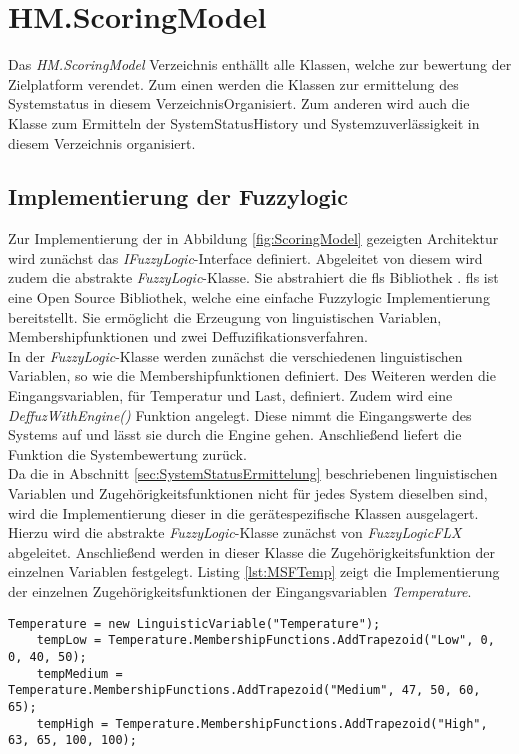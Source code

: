 \section{HM.ScoringModel}
Das \textit{HM.ScoringModel} Verzeichnis enthällt alle Klassen, welche zur bewertung der Zielplatform verendet. Zum einen werden die Klassen zur ermittelung des Systemstatus in diesem VerzeichnisOrganisiert. Zum anderen wird auch die Klasse zum Ermitteln der SystemStatusHistory und Systemzuverlässigkeit in diesem Verzeichnis organisiert.

\subsection{Implementierung der Fuzzylogic}
Zur Implementierung der in Abbildung \ref{fig:ScoringModel} gezeigten Architektur wird zunächst das \textit{IFuzzyLogic}-Interface definiert. Abgeleitet von diesem wird zudem die abstrakte \textit{FuzzyLogic}-Klasse. Sie abstrahiert die \ac{fls} Bibliothek \cite{FLSGit}. \ac{fls} ist eine Open Source Bibliothek, welche eine einfache Fuzzylogic Implementierung bereitstellt. Sie ermöglicht die Erzeugung von linguistischen Variablen, Membershipfunktionen und zwei Deffuzifikationsverfahren.\\
In der \textit{FuzzyLogic}-Klasse werden zunächst die verschiedenen linguistischen Variablen, so wie die Membershipfunktionen definiert. Des Weiteren werden die Eingangsvariablen, für Temperatur und Last, definiert. 
Zudem wird eine \textit{DeffuzWithEngine()} Funktion angelegt. Diese nimmt die Eingangswerte des Systems auf und lässt sie durch die Engine gehen. Anschließend liefert die Funktion die Systembewertung zurück.\\
Da die in Abschnitt \ref{sec:SystemStatusErmittelung} beschriebenen linguistischen Variablen und Zugehörigkeitsfunktionen nicht für jedes System dieselben sind, wird die Implementierung dieser in die gerätespezifische Klassen ausgelagert. Hierzu wird die abstrakte \textit{FuzzyLogic}-Klasse zunächst von \textit{FuzzyLogicFLX} abgeleitet. Anschließend werden in dieser Klasse die Zugehörigkeitsfunktion der einzelnen Variablen festgelegt. Listing \ref{lst:MSFTemp} zeigt die Implementierung der einzelnen Zugehörigkeitsfunktionen der Eingangsvariablen \textit{Temperature}.\\
\begin{lstlisting}[caption={Implementierung der Zugehörigkeitsfunktionen zur Eingangsvariable \textit{Temperature}}, label={lst:MSFTemp}]
    Temperature = new LinguisticVariable("Temperature");
    tempLow = Temperature.MembershipFunctions.AddTrapezoid("Low", 0, 0, 40, 50);
    tempMedium = Temperature.MembershipFunctions.AddTrapezoid("Medium", 47, 50, 60, 65);
    tempHigh = Temperature.MembershipFunctions.AddTrapezoid("High", 63, 65, 100, 100);
\end{lstlisting}
